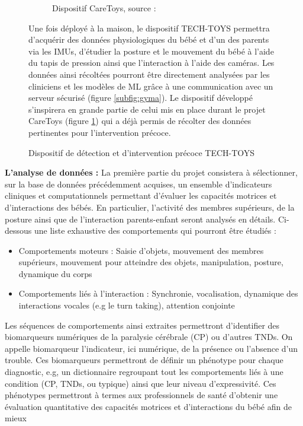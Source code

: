 \documentclass[5pt]{article}
\begin{document}
\begin{figure}[H]
\begin{subfigure}{1\textwidth}
        \caption{Dispositif CareToys, source : \cite{cecchi_caretoy_2016}}
        \label{subfig:gymb}
    \end{subfigure}
    \caption{Dispositif de détection et d’intervention précoce TECH-TOYS}
    \label{fig:gym}
    \footnotesize
    \vspace{.2cm}
    Une fois déployé à la maison, le dispositif TECH-TOYS permettra d’acquérir des données physiologiques du bébé et d’un des parents via les IMUs, d’étudier la posture et le mouvement du bébé à l’aide du tapis de pression ainsi que l’interaction
à l’aide des caméras. Les données ainsi récoltées pourront être directement analysées par les cliniciens et les modèles de ML grâce à une communication avec un serveur sécurisé (figure \ref{subfig:gyma}). Le dispositif développé s’inspirera en grande partie de celui mis en place durant le projet CareToys (figure \ref{subfig:gymb}) qui a déjà permis de récolter des données pertinentes pour l’intervention précoce.
\end{figure}
\vspace{2cm}
\textbf{L'analyse de données : } La première partie du projet consistera à sélectionner, sur la base de données précédemment acquises, un ensemble d’indicateurs cliniques et computationnels permettant d’évaluer les capacités motrices et d’interactions des bébés. En particulier, l’activité des membres supérieurs, de la posture ainsi que de l’interaction parents-enfant seront analysés en détails. Ci-dessous une liste exhaustive des comportements qui pourront être étudiés :
 \begin{itemize}
     \item Comportements moteurs : Saisie d’objets, mouvement des membres supérieurs, mouvement pour
atteindre des objets, manipulation, posture, dynamique du corps
\item Comportements liés à l’interaction : Synchronie, vocalisation, dynamique des interactions vocales
(e.g le turn taking), attention conjointe
 \end{itemize}
 Les séquences de comportements ainsi extraites permettront d’identifier des biomarqueurs numériques de
la paralysie cérébrale (CP) ou d’autres TNDs. On appelle biomarqueur l’indicateur, ici numérique, de la
présence ou l’absence d’un trouble. Ces biomarqueurs permettront de définir un phénotype pour chaque
diagnostic, e.g, un dictionnaire regroupant tout les comportements liés à une condition (CP, TNDs, ou
typique) ainsi que leur niveau d’expressivité. Ces phénotypes permettront à termes aux professionnels de
santé d’obtenir une évaluation quantitative des capacités motrices et d’interactions du bébé afin de mieux
\end{document}
